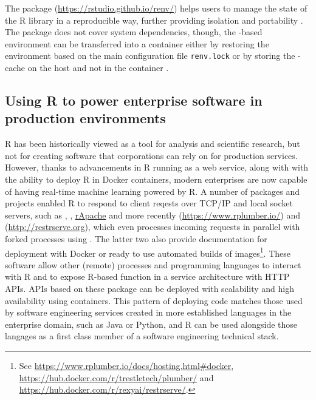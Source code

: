 The package \textbf{}
(\url{https://rstudio.github.io/renv/}) helps users to manage the state
of the R library in a reproducible way, further providing isolation and
portability \citep{renv2019}. The package does not cover system
dependencies, though, the -based environment can be
transferred into a container either by restoring the environment based
on the main configuration file \texttt{renv.lock} or by storing the
-cache on the host and not in the container
\citep{ushey_using_2019}.

\hypertarget{using-r-to-power-enterprise-software-in-production-environments}{%
\subsection{Using R to power enterprise software in production
environments}\label{using-r-to-power-enterprise-software-in-production-environments}}

\label{enterprise}

R has been historically viewed as a tool for analysis and scientific
research, but not for creating software that corporations can rely on
for production services. However, thanks to advancements in R running as
a web service, along with with the ability to deploy R in Docker
containers, modern enterprises are now capable of having real-time
machine learning powered by R. A number of packages and projects enabled
R to respond to client reqests over TCP/IP and local socket servers,
such as , ,
\href{http://www.rapache.net}{rApache} and more recently
 (\url{https://www.rplumber.io/}) and 
(\url{http://restrserve.org}), which even processes incoming requests in
parallel with forked processes using . The latter two
also provide documentation for deployment with Docker or ready to use
automated builds of
images\footnote{See \href{https://www.rplumber.io/docs/hosting.html\#docker}{https://www.rplumber.io/docs/hosting.html\#docker}, \href{https://hub.docker.com/r/trestletech/plumber/}{https://hub.docker.com/r/trestletech/plumber/} and \href{https://hub.docker.com/r/rexyai/restrserve/}{https://hub.docker.com/r/rexyai/restrserve/}.}.
These software allow other (remote) processes and programming languages
to interact with R and to expose R-based function in a service
architecture with HTTP APIs. APIs based on these package can be deployed
with scalability and high availability using containers. This pattern of
deploying code matches those used by software engineering services
created in more established languages in the enterprise domain, such as
Java or Python, and R can be used alongside those langages as a first
class member of a software engineering technical stack.


